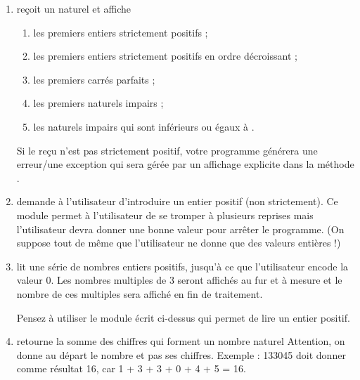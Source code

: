 \documentclass[11pt,a4paper]{article}
\begin{document}
					\begin{enumerate}
				
			\item re\c coit un naturel \verb@n@ et affiche
              
					\begin{enumerate}
				
			\item les \verb@n@ premiers entiers strictement positifs ;
			\item les \verb@n@ premiers entiers strictement positifs en ordre d\'ecroissant ;
			\item les \verb@n@ premiers carr\'es parfaits ;
			\item les \verb@n@ premiers naturels impairs ;
			\item les naturels impairs qui sont inf\'erieurs ou \'egaux \`a \verb@n@.
					\end{enumerate}
				
              Si le \verb@n@ re\c cu n'est pas strictement positif, votre programme g\'en\'erera une erreur/une exception 
              qui sera g\'er\'ee par un affichage explicite dans la m\'ethode \verb@main@.
            
			\item 
              demande \`a l'utilisateur d'introduire un entier positif (non strictement). 
              Ce module permet \`a l'utilisateur de se tromper \`a plusieurs reprises mais l'utilisateur devra donner
              une bonne valeur pour arr\^eter le programme.
              (On suppose tout de m\^eme que l'utilisateur ne donne que des valeurs enti\`eres !) 
            
			\item 
              lit une s\'erie de nombres entiers positifs, jusqu'\`a ce que l'utilisateur
              encode la valeur 0. Les nombres multiples de 3 seront affich\'es au fur et \`a mesure et le nombre
              de ces multiples sera affich\'e en fin de traitement.
              
            \par
        
              Pensez \`a utiliser le module \'ecrit ci-dessus qui permet de lire un entier positif.
              
            \par
        
			\item 
              retourne la somme des chiffres qui forment un nombre naturel \verb@n@
              Attention, on donne au d\'epart le nombre et pas ses chiffres. Exemple : 133045 doit donner
              comme r\'esultat 16, car 1 + 3 + 3 + 0 + 4 + 5 = 16.
            

\end{enumerate}
\end{document}
